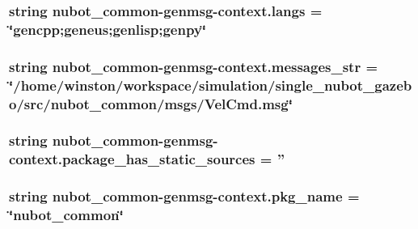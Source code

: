 \hypertarget{namespacenubot__common-genmsg-context_ad47fe39b5ca574c609a0a44451d67ebe}{
\subsubsection[{langs}]{\setlength{\rightskip}{0pt plus 5cm}string nubot\-\_\-common-\/genmsg-\/context.\-langs = \char`\"{}gencpp;geneus;genlisp;genpy\char`\"{}}}\label{namespacenubot__common-genmsg-context_ad47fe39b5ca574c609a0a44451d67ebe}
\hypertarget{namespacenubot__common-genmsg-context_a9d82d20e4ffa677c598751d6630dc734}{
\subsubsection[{messages\-\_\-str}]{\setlength{\rightskip}{0pt plus 5cm}string nubot\-\_\-common-\/genmsg-\/context.\-messages\-\_\-str = \char`\"{}/home/winston/workspace/simulation/single\-\_\-nubot\-\_\-gazebo/src/nubot\-\_\-common/msgs/Vel\-Cmd.\-msg\char`\"{}}}\label{namespacenubot__common-genmsg-context_a9d82d20e4ffa677c598751d6630dc734}
\hypertarget{namespacenubot__common-genmsg-context_a9b23bed4614ce829e09eb98736bbcfb6}{
\subsubsection[{package\-\_\-has\-\_\-static\-\_\-sources}]{\setlength{\rightskip}{0pt plus 5cm}string nubot\-\_\-common-\/genmsg-\/context.\-package\-\_\-has\-\_\-static\-\_\-sources = ''}}\label{namespacenubot__common-genmsg-context_a9b23bed4614ce829e09eb98736bbcfb6}
\hypertarget{namespacenubot__common-genmsg-context_aa7e82af182943505146665259b8e1ce9}{
\subsubsection[{pkg\-\_\-name}]{\setlength{\rightskip}{0pt plus 5cm}string nubot\-\_\-common-\/genmsg-\/context.\-pkg\-\_\-name = \char`\"{}nubot\-\_\-common\char`\"{}}}\label{namespacenubot__common-genmsg-context_aa7e82af182943505146665259b8e1ce9}

